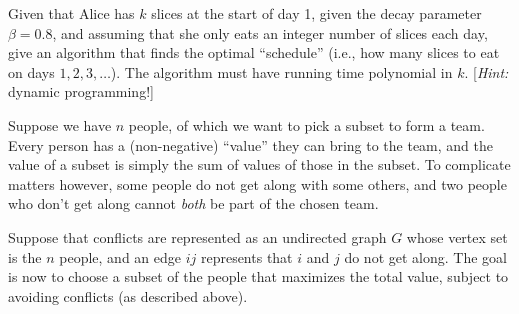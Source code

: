 \documentclass[addpoints]{exam}
\begin{document}
\begin{questions}
Given that Alice has $k$ slices at the start of day 1, given the decay parameter $\beta = 0.8$, and assuming that she only eats an integer number of slices each day, give an algorithm that finds the optimal ``schedule'' (i.e., how many slices to eat on days $1, 2, 3, \dots$). The algorithm must have running time polynomial in $k$.   [{\em Hint: } dynamic programming!]

Suppose we have $n$ people, of which we want to pick a subset to form a team. Every person has a (non-negative) ``value'' they can bring to the team, and the value of a subset is simply the sum of values of those in the subset. To complicate matters however, some people do not get along with some others, and two people who don't get along cannot {\em both} be part of the chosen team.

Suppose that conflicts are represented as an undirected graph $G$ whose vertex set is the $n$ people, and an edge $ij$ represents that $i$ and $j$ do not get along. The goal is now to choose a subset of the people that maximizes the total value, subject to avoiding conflicts (as described above).


\end{questions}
\end{document}
